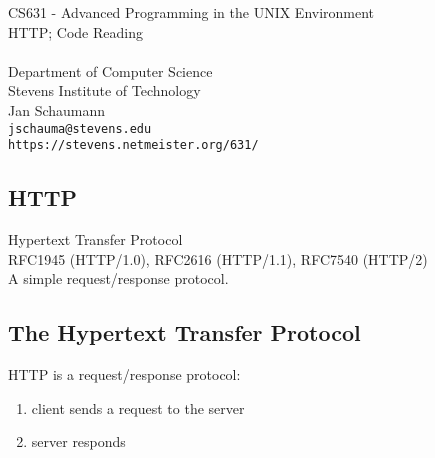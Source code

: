 \documentclass[xga]{xdvislides}
\begin{document}
\setfontphv

\lhead{\slidetitle}                               %
\cfoot{\relax}                               %
\rfoot{\Gray{\today}}

\newcommand{\smallish}{\fontsize{15}{20}\selectfont}

\vspace*{\fill}
\begin{center}
	\Hugesize
		CS631 - Advanced Programming in the UNIX Environment\\ [1em]
		HTTP; Code Reading\\ [1em]
	\hspace*{5mm}\blueline\\ [1em]
	\Normalsize
		Department of Computer Science\\
		Stevens Institute of Technology\\
		Jan Schaumann\\
		\verb+jschauma@stevens.edu+ \\
		\verb+https://stevens.netmeister.org/631/+
\end{center}
\vspace*{\fill}

\subsection{HTTP}
\vspace{.5in}
\begin{center}
	\Huge
	Hypertext Transfer Protocol
	\\
	\vspace{.5in}
	RFC1945 (HTTP/1.0), RFC2616 (HTTP/1.1), RFC7540 (HTTP/2)\\
	\vspace{.5in}
	A simple request/response protocol.
\end{center}
\Normalsize

\subsection{The Hypertext Transfer Protocol}
HTTP is a request/response protocol:
\begin{enumerate}
	\item client sends a request to the server
	\item server responds
\end{enumerate}
\end{document}
